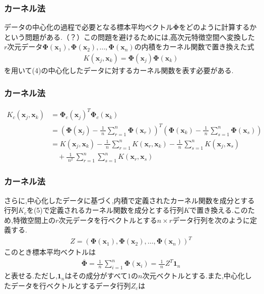 \documentclass[dvipdfmx,cjk]{beamer}
\theoremstyle{example}
\begin{document}
\begin{frame}
    \frametitle{カーネル法}
    データの中心化の過程で必要となる標本平均ベクトル$\overline{\boldsymbol{\Phi}}$をどのように計算するかという問題がある.（？）この問題を避けるためには,高次元特徴空間へ変換した$r$次元データ$\boldsymbol{\Phi}(\boldsymbol{x}_1),\boldsymbol{\Phi}(\boldsymbol{x}_2),\dots,\boldsymbol{\Phi}(\boldsymbol{x}_n)$の内積をカーネル関数で置き換えた式
    \begin{align*}
        K(\boldsymbol{x}_j,\boldsymbol{x}_k)={\boldsymbol{\Phi}(\boldsymbol{x}_j)}\boldsymbol{\Phi}(\boldsymbol{x}_k)\tag{5}
    \end{align*}
    を用いて(4)の中心化したデータに対するカーネル関数を表す必要がある.
\end{frame}
\begin{frame}
    \frametitle{カーネル法}
    \begin{align*}
        K_c(\boldsymbol{x}_j,\boldsymbol{x}_k) & ={\boldsymbol{\Phi}_c(\boldsymbol{x}_j)}^T\boldsymbol{\Phi}_c(\boldsymbol{x}_k)                                                                                                                                                       \\
                                               & =\left(\boldsymbol{\Phi}(\boldsymbol{x}_j)-\frac{1}{\;n\;}\sum_{r=1}^{n}\boldsymbol{\Phi}(\boldsymbol{x}_r)\right)^T\left(\boldsymbol{\Phi}(\boldsymbol{x}_k)-\frac{1}{\;n\;}\sum_{s=1}^{n}\boldsymbol{\Phi}(\boldsymbol{x}_s)\right) \\
                                               & =K(\boldsymbol{x}_j,\boldsymbol{x}_k)-\frac{1}{\;n\;}\sum_{r=1}^{n}K(\boldsymbol{x}_r,\boldsymbol{x}_k)-\frac{1}{\;n\;}\sum_{s=1}^{n}K(\boldsymbol{x}_j,\boldsymbol{x}_s)                                                             \\&\quad+\frac{1}{\;n^2\;}\sum_{r=1}^{n}\sum_{s=1}^{n}K(\boldsymbol{x}_r,\boldsymbol{x}_s)
    \end{align*}
\end{frame}
\begin{frame}
    \frametitle{カーネル法}
    さらに,中心化したデータに基づく,内積で定義されたカーネル関数を成分とする行列$K_c$を(5)で定義されるカーネル関数を成分とする行列$K$で置き換える.このため,特徴空間上の$r$次元データを行ベクトルとする$n\times r$データ行列を次のように定義する.
    \begin{align*}
        Z=\left(\boldsymbol{\Phi}(\boldsymbol{x}_1),\boldsymbol{\Phi}(\boldsymbol{x}_2),\dots,\boldsymbol{\Phi}(\boldsymbol{x}_n)\right)^T
    \end{align*}
    このとき標本平均ベクトルは
    \begin{align*}
        \overline{\boldsymbol{\Phi}}=\frac{1}{\;n\;}\sum_{i=1}^{n}\boldsymbol{\Phi}(\boldsymbol{x}_i)=\frac{1}{\;n\;}Z^T\boldsymbol{1}_n
    \end{align*}
    と表せる.ただし,$\boldsymbol{1}_n$はその成分がすべて$1$の$n$次元ベクトルとする.また,中心化したデータを行ベクトルとするデータ行列$Z_c$は
\end{frame}
\end{document}
